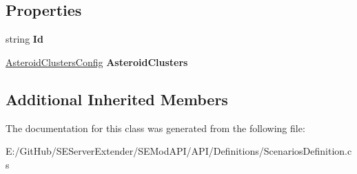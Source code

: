 \subsection*{Properties}
\begin{DoxyCompactItemize}
\item 
\hypertarget{class_s_e_mod_a_p_i_1_1_a_p_i_1_1_definitions_1_1_scenarios_definition_a86160fc53feabbc0e702750c69c0ca23}{}string {\bfseries Id}\label{class_s_e_mod_a_p_i_1_1_a_p_i_1_1_definitions_1_1_scenarios_definition_a86160fc53feabbc0e702750c69c0ca23}

\item 
\hypertarget{class_s_e_mod_a_p_i_1_1_a_p_i_1_1_definitions_1_1_scenarios_definition_a9d914946d308bc52d149588ea22af4a1}{}\hyperlink{class_s_e_mod_a_p_i_1_1_a_p_i_1_1_definitions_1_1_asteroid_clusters_config}{Asteroid\+Clusters\+Config} {\bfseries Asteroid\+Clusters}\label{class_s_e_mod_a_p_i_1_1_a_p_i_1_1_definitions_1_1_scenarios_definition_a9d914946d308bc52d149588ea22af4a1}

\end{DoxyCompactItemize}
\subsection*{Additional Inherited Members}


The documentation for this class was generated from the following file\+:\begin{DoxyCompactItemize}
\item 
E\+:/\+Git\+Hub/\+S\+E\+Server\+Extender/\+S\+E\+Mod\+A\+P\+I/\+A\+P\+I/\+Definitions/Scenarios\+Definition.\+cs\end{DoxyCompactItemize}
